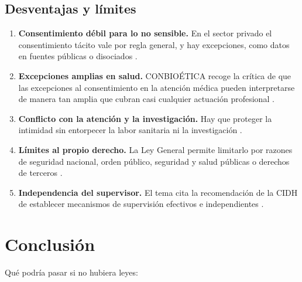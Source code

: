 \documentclass[11pt,letterpaper]{article}
\begin{document}
\subsection{Desventajas y límites}

\begin{enumerate}
    \item \textbf{Consentimiento débil para lo no sensible.} En el sector privado el consentimiento tácito vale por regla general, y hay excepciones, como datos en fuentes públicas o disociados \parencite[arts.~7 y 9]{lfpdppp2025}.
    \item \textbf{Excepciones amplias en salud.} CONBIOÉTICA recoge la crítica de que las excepciones al consentimiento en la atención médica pueden interpretarse de manera tan amplia que cubran casi cualquier actuación profesional \parencite{conbioetica2014}.
    \item \textbf{Conflicto con la atención y la investigación.} Hay que proteger la intimidad sin entorpecer la labor sanitaria ni la investigación \parencite{conbioetica2014}.
    \item \textbf{Límites al propio derecho.} La Ley General permite limitarlo por razones de seguridad nacional, orden público, seguridad y salud públicas o derechos de terceros \parencite[art.~6]{lgpdppso2025}.
    \item \textbf{Independencia del supervisor.} El tema cita la recomendación de la CIDH de establecer mecanismos de supervisión efectivos e independientes \parencite{iae_u6_t61}.
\end{enumerate}

\section{Conclusión}

Qué podría pasar si no hubiera leyes:
\end{document}
